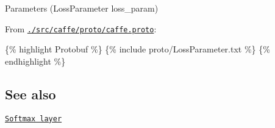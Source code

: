 \begin{DoxyItemize}
\item Parameters ({\ttfamily Loss\+Parameter loss\+\_\+param})
\item From \href{https://github.com/BVLC/caffe/blob/master/src/caffe/proto/caffe.proto}{\tt {\ttfamily ./src/caffe/proto/caffe.proto}}\+:
\end{DoxyItemize}

\{\% highlight Protobuf \%\} \{\% include proto/\+Loss\+Parameter.\+txt \%\} \{\% endhighlight \%\}

\subsection*{See also}


\begin{DoxyItemize}
\item \href{softmax.html}{\tt Softmax layer} 
\end{DoxyItemize}